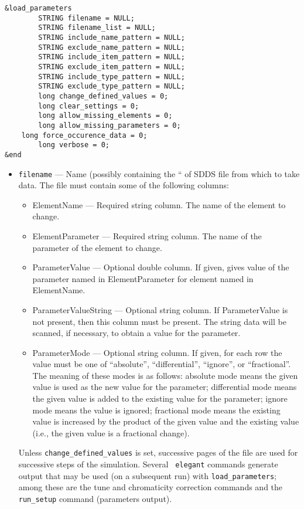 \documentclass[11pt]{article}
\begin{document}
\begin{verbatim}
&load_parameters
        STRING filename = NULL;
        STRING filename_list = NULL;
        STRING include_name_pattern = NULL;
        STRING exclude_name_pattern = NULL;
        STRING include_item_pattern = NULL;
        STRING exclude_item_pattern = NULL;
        STRING include_type_pattern = NULL;
        STRING exclude_type_pattern = NULL;
        long change_defined_values = 0;
        long clear_settings = 0;
        long allow_missing_elements = 0;
        long allow_missing_parameters = 0;
	long force_occurence_data = 0;
        long verbose = 0;
&end
\end{verbatim}

\begin{itemize}
\item \verb|filename| --- Name (possibly containing the ``%
of SDDS file from which to take data.  The file
must contain some of the following columns:
\begin{itemize}
\item ElementName --- Required string column.  The name of the element to change.
\item ElementParameter --- Required string column.  The name of the parameter of the element to change.
\item ParameterValue --- Optional double column.  If given, gives value of the parameter named
 in ElementParameter for element named in ElementName.
\item ParameterValueString --- Optional string column.  If ParameterValue is not present, then
this column must be present.  The string data will be scanned, if necessary,
to obtain a value for the parameter.
\item ParameterMode --- Optional string column.  If given, for each row the value must be
one of ``absolute'', ``differential'', ``ignore'', or ``fractional''.  The meaning of these
modes is as follows: absolute mode means the given value is used as the new value for
the parameter; differential mode means the given value is added to the existing value
for the parameter; ignore mode means the value is ignored; fractional mode means the
existing value is increased by the product of the given value and the existing value 
(i.e., the given value is a fractional change).
\end{itemize}

Unless \verb|change_defined_values| is set, successive pages of the
file are used for successive steps of the simulation.  Several {\tt
elegant} commands generate output that may be used (on a subsequent
run) with \verb|load_parameters|; among these are the tune and
chromaticity correction commands and the \verb|run_setup| command
(parameters output).


\end{itemize}
\end{document}
